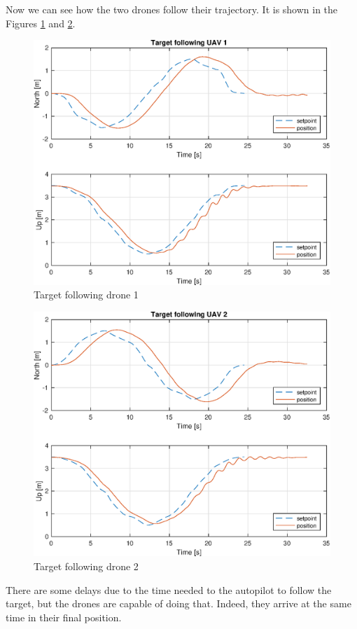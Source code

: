Now we can see how the two drones follow their trajectory. It is shown in the Figures
\ref{fig:following_1} and \ref{fig:following_2}.

\begin{figure}
\centering
\includegraphics[width=0.7\linewidth]{chapters/chapter-04/figures/following_1.eps}
\caption{Target following drone 1}
\label{fig:following_1}
\end{figure}

\begin{figure}
\centering
\includegraphics[width=0.7\linewidth]{chapters/chapter-04/figures/following_2.eps}
\caption{Target following drone 2}
\label{fig:following_2}
\end{figure}

There are some delays due to the time needed to the autopilot to follow
the target, but the drones are capable of doing that.
Indeed, they arrive at the same time in their final position.

